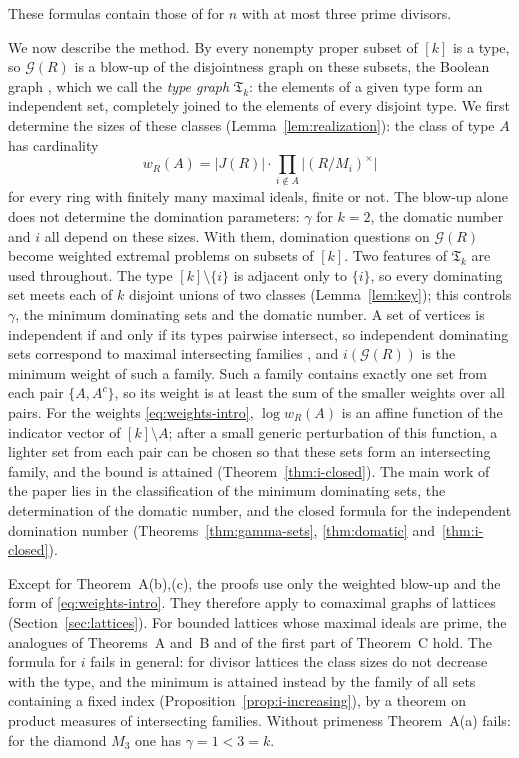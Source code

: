 \documentclass[11pt]{amsart}
\theoremstyle{definition}
\theoremstyle{remark}
\newcommand{\Jac}{J}
\newcommand{\G}{\mathcal{G}}
\newcommand{\TG}{\mathfrak{T}}
\begin{document}
These formulas contain those of \cite{Ra26a,Ra26b} for $n$ with at most three prime divisors.

We now describe the method. By \cite[Proposition~2.3, Theorem~2.4]{MP11} every nonempty proper subset of $[k]$ is a type, so
$\G(R)$ is a blow-up of the disjointness graph on these subsets, the Boolean graph \cite{GWY15},
which we call the \emph{type graph} $\TG_k$: the elements of a given type form an independent set,
completely joined to the elements of every disjoint type. We first determine the sizes of these
classes (Lemma~\ref{lem:realization}): the class of type $A$ has cardinality
\begin{equation}\label{eq:weights-intro}
  w_R(A)=|\Jac(R)|\cdot\prod_{i\notin A}\bigl|(R/M_i)^{\times}\bigr|
\end{equation}
for every ring with finitely many maximal ideals, finite or not. The blow-up alone does not
determine the domination parameters: $\gamma$ for $k=2$, the domatic number and $i$ all depend on
these sizes. With them, domination questions on $\G(R)$ become weighted extremal problems on
subsets of $[k]$. Two features of $\TG_k$ are used
throughout. The type $[k]\setminus\{i\}$ is adjacent only to $\{i\}$, so every dominating set meets
each of $k$ disjoint unions of two classes (Lemma~\ref{lem:key}); this controls $\gamma$, the
minimum dominating sets and the domatic number. A set of vertices is independent if and only if
its types pairwise intersect, so independent dominating sets correspond to maximal intersecting
families \cite{EKR61}, and $i(\G(R))$ is the minimum weight of such a family. Such a family contains
exactly one set from each pair $\{A,A^c\}$, so its weight is at least the sum of the smaller weights
over all pairs. For the weights \eqref{eq:weights-intro}, $\log w_R(A)$ is an affine function of the
indicator vector of $[k]\setminus A$; after a small generic perturbation of this function, a lighter
set from each pair can be chosen so that these sets form an intersecting family, and the bound is
attained (Theorem~\ref{thm:i-closed}). The main work of the paper lies in the
classification of the minimum dominating sets, the determination of the domatic number, and the
closed formula for the independent domination number (Theorems~\ref{thm:gamma-sets},
\ref{thm:domatic} and~\ref{thm:i-closed}).

Except for Theorem~A(b),(c), the proofs use only the weighted blow-up and the form of
\eqref{eq:weights-intro}. They therefore apply to comaximal graphs of lattices \cite{AK14}
(Section~\ref{sec:lattices}). For bounded lattices whose maximal ideals are prime, the analogues of
Theorems~A and~B and of the first part of Theorem~C hold. The formula for $i$ fails in general: for
divisor lattices the class sizes do not decrease with the type, and the minimum is attained instead
by the family of all sets containing a fixed index (Proposition~\ref{prop:i-increasing}), by a theorem on product
measures of intersecting families. Without primeness Theorem~A(a) fails: for the diamond $M_3$ one has
$\gamma=1<3=k$.
\end{document}
